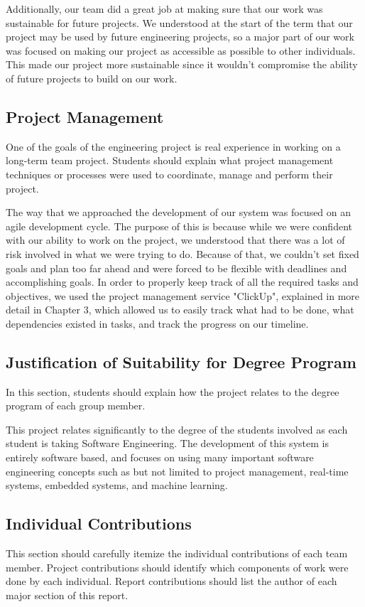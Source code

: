 \documentclass[titlepage,draft]{article}
\begin{document}
Additionally, our team did a great job at making sure that our work was sustainable for future projects. We understood at the start of the term that our project may be used by future engineering projects, so a major part of our work was focused on making our project as accessible as possible to other individuals. This made our project more sustainable since it wouldn't compromise the ability of future projects to build on our work.

\subsection{Project Management}
One of the goals of the engineering project is real experience in working on a long-term team project. Students should explain what project management techniques or processes were used to coordinate, manage and perform their project.

The way that we approached the development of our system was focused on an agile development cycle. The purpose of this is because while we were confident with our ability to work on the project, we understood that there was a lot of risk involved in what we were trying to do. Because of that, we couldn't set fixed goals and plan too far ahead and were forced to be flexible with deadlines and accomplishing goals. In order to properly keep track of all the required tasks and objectives, we used the project management service "ClickUp", explained in more detail in Chapter 3, which allowed us to easily track what had to be done, what dependencies existed in tasks, and track the progress on our timeline.

\subsection{Justification of Suitability for Degree Program}
In this section, students should explain how the project
relates to the degree program of each group member.

This project relates significantly to the degree of the students involved as each student is taking Software Engineering. The development of this system is entirely software based, and focuses on using many important software engineering concepts such as but not limited to project management, real-time systems, embedded systems, and machine learning.


\subsection{Individual Contributions}
This section should carefully itemize the individual contributions of each team member. Project contributions should identify which components of work were done by each  individual. Report contributions should list the author of  each major section of this report.
\end{document}
